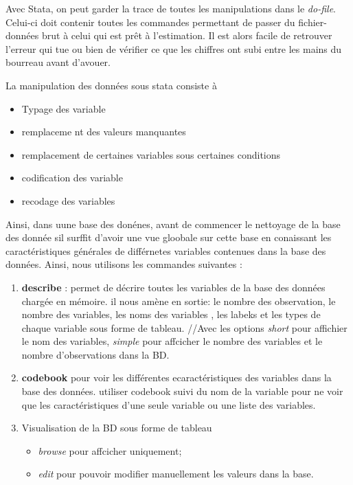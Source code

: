 \documentclass[
]{book}
\providecommand{\tightlist}{%
  \setlength{\itemsep}{0pt}\setlength{\parskip}{0pt}}
\begin{document}
Avec Stata, on peut garder la trace de toutes les manipulations dans le \emph{do-file}. Celui-ci doit contenir toutes les commandes permettant de passer du fichier-données brut à celui qui est prêt à l'estimation. Il est alors facile de retrouver l'erreur qui tue ou bien de vérifier ce que les chiffres ont subi entre les mains du bourreau avant d'avouer.

La manipulation des données sous stata consiste à

\begin{itemize}
\tightlist
\item
  Typage des variable
\item
  remplaceme nt des valeurs manquantes
\item
  remplacement de certaines variables sous certaines conditions
\item
  codification des variable
\item
  recodage des variables
\end{itemize}

Ainsi, dans uune base des donénes, avant de commencer le nettoyage de la base des donnée sil surffit d'avoir une vue gloobale sur cette base en conaissant les caractéristiques générales de différnetes variables contenues dans la base des données.
Ainsi, nous utilisons les commandes suivantes :

\begin{enumerate}
\def\labelenumi{(\arabic{enumi})}
\tightlist
\item
  \textbf{describe} : permet de décrire toutes les variables de la base des données chargée en mémoire. il nous amène en sortie: le nombre des observation, le nombre des variables, les noms des variables , les labeks et les types de chaque variable sous forme de tableau. //Avec les options \emph{short} pour affichier le nom des variables, \emph{simple} pour affcicher le nombre des variables et le nombre d'observations dans la BD.
\item
  \textbf{codebook} pour voir les différentes ecaractéristiques des variables dans la base des données. utiliser codebook suivi du nom de la variable pour ne voir que les caractéristiques d'une seule variable ou une liste des variables.
\item
  Visualisation de la BD sous forme de tableau

  \begin{itemize}
  \tightlist
  \item
    \emph{browse} pour affcicher uniquement;
  \item
    \emph{edit} pour pouvoir modifier manuellement les valeurs dans la base.
  \end{itemize}
\end{enumerate}
\end{document}

